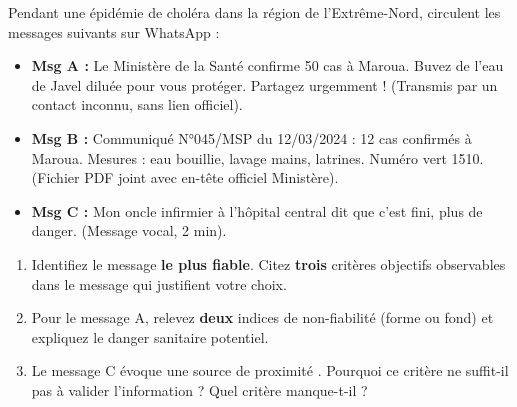 \documentclass[11pt]{article}
\begin{document}
\begin{exercice}
Pendant une épidémie de choléra dans la région de l'Extrême-Nord, circulent les messages suivants sur WhatsApp :
\begin{itemize}
    \item \textbf{Msg A :} \og Le Ministère de la Santé confirme 50 cas à Maroua. Buvez de l'eau de Javel diluée pour vous protéger. Partagez urgemment ! \fg (Transmis par un contact inconnu, sans lien officiel).
    \item \textbf{Msg B :} \og Communiqué N°045/MSP du 12/03/2024 : 12 cas confirmés à Maroua. Mesures : eau bouillie, lavage mains, latrines. Numéro vert 1510. \fg (Fichier PDF joint avec en-tête officiel Ministère).
    \item \textbf{Msg C :} \og Mon oncle infirmier à l'hôpital central dit que c'est fini, plus de danger. \fg (Message vocal, 2 min).
\end{itemize}
\begin{enumerate}
    \item Identifiez le message \textbf{le plus fiable}. Citez \textbf{trois} critères objectifs observables dans le message qui justifient votre choix.
    \item Pour le message A, relevez \textbf{deux} indices de non-fiabilité (forme ou fond) et expliquez le danger sanitaire potentiel.
    \item Le message C évoque une source \og de proximité \fg. Pourquoi ce critère ne suffit-il pas à valider l'information ? Quel critère manque-t-il ?
\end{enumerate}
\end{exercice}
\end{document}
